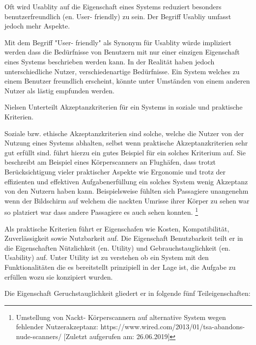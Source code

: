 \cite{Nielsen1994,RexHartson2012} Oft wird Usablity auf die Eigenschaft eines Systems reduziert besonders benutzerfreundlich (en. User- friendly) zu sein. Der Begriff Usabliy umfasst jedoch mehr Aspekte. 

\cite{Nielsen1994} Mit dem Begriff "User- friendly" als Synonym für Usablity würde impliziert werden dass die Bedürfnisse von Benutzern mit nur einer einzigen Eigenschaft eines Systems beschrieben werden kann. 
In der Realität haben jedoch unterschiedliche Nutzer, verschiedenartige Bedürfnisse. Ein System welches zu einem Benutzer freundlich erscheint, könnte unter Umständen von einem anderen Nutzer als lästig empfunden werden.

Nielsen Unterteilt Akzeptanzkriterien für ein Systems in soziale und praktische Kriterien.

Soziale bzw. ethische Akzeptanzkriterien sind solche, welche  die Nutzer von der Nutzung eines Systems abhalten, selbst wenn praktische Akzeptanzkriterien sehr gut erfüllt sind. 
\cite[S.~285]{Spiekermann2016} führt hierzu ein gutes Beispiel für ein solches Kriterium auf. Sie beschreibt am Beispiel eines Körperscanners an Flughäfen, dass trotzt  Berücksichtigung vieler 
praktischer Aspekte wie Ergonomie und trotz der effizienten und effektiven Aufgabenerfüllung ein solches System wenig Akzeptanz von den Nutzern haben kann. Beispielsweise fühlten sich Passagiere 
unangenehm wenn der Bildschirm auf welchem die nackten Umrisse ihrer Körper zu sehen war so platziert war dass andere Passagiere es auch sehen konnten.  
\footnote{Umstellung von Nackt- Körperscannern auf alternative System wegen fehlender Nutzerakzeptanz: https://www.wired.com/2013/01/tsa-abandons-nude-scanners/ [Zuletzt aufgerufen am: 26.06.2019]}


Als praktische Kriterien führt er Eigenschafen wie Kosten, Kompatibilität, Zuverlässigkeit sowie Nutzbarkeit auf. Die Eigenschaft Benutzbarkeit teilt er in die Eigenschaften Nützlichkeit (en. Utility) und Gebrauchstauglichkeit (en. Usability) auf. Unter Utility ist zu verstehen ob ein System mit den Funktionalitäten die es bereitstellt prinzipiell in der Lage ist, die Aufgabe zu erfüllen wozu sie konzipiert wurden.

Die Eigenschaft Geruchstauglichkeit gliedert er in folgende fünf Teileigenschaften: 

